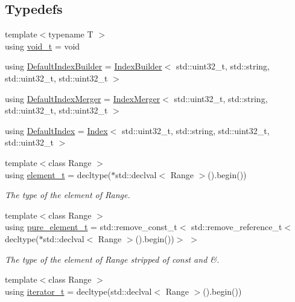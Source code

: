 \subsection*{Typedefs}
\begin{DoxyCompactItemize}
\item 
{\footnotesize template$<$typename T $>$ }\\using \hyperlink{namespaceirkit_ad3b30e41bd53e61f81bbd892123abe1a}{void\+\_\+t} = void
\item 
using \hyperlink{namespaceirkit_aefd5a5c2f1136e9c2224a4b4d659d4a9}{Default\+Index\+Builder} = \hyperlink{classirkit_1_1IndexBuilder}{Index\+Builder}$<$ std\+::uint32\+\_\+t, std\+::string, std\+::uint32\+\_\+t, std\+::uint32\+\_\+t $>$
\item 
using \hyperlink{namespaceirkit_a434fa5b33380811cba36a6b46d487373}{Default\+Index\+Merger} = \hyperlink{classirkit_1_1IndexMerger}{Index\+Merger}$<$ std\+::uint32\+\_\+t, std\+::string, std\+::uint32\+\_\+t, std\+::uint32\+\_\+t $>$
\item 
using \hyperlink{namespaceirkit_a6f3d282716b38521a43b65100a6d337b}{Default\+Index} = \hyperlink{classirkit_1_1Index}{Index}$<$ std\+::uint32\+\_\+t, std\+::string, std\+::uint32\+\_\+t, std\+::uint32\+\_\+t $>$
\item 
{\footnotesize template$<$class Range $>$ }\\using \hyperlink{namespaceirkit_a40deb8b0d47ecaada4b47270b97d5469}{element\+\_\+t} = decltype($\ast$std\+::declval$<$ Range $>$().begin())
\begin{DoxyCompactList}\small\item\em The type of the element of Range. \end{DoxyCompactList}\item 
{\footnotesize template$<$class Range $>$ }\\using \hyperlink{namespaceirkit_afcffab67300c5c703cb38a363c9a6f1d}{pure\+\_\+element\+\_\+t} = std\+::remove\+\_\+const\+\_\+t$<$ std\+::remove\+\_\+reference\+\_\+t$<$ decltype($\ast$std\+::declval$<$ Range $>$().begin())$>$ $>$
\begin{DoxyCompactList}\small\item\em The type of the element of Range stripped of {\ttfamily const} and {\ttfamily \&}. \end{DoxyCompactList}\item 
{\footnotesize template$<$class Range $>$ }\\using \hyperlink{namespaceirkit_af390a50be8f636e7239c650e5043c56f}{iterator\+\_\+t} = decltype(std\+::declval$<$ Range $>$().begin())

\end{DoxyCompactItemize}
